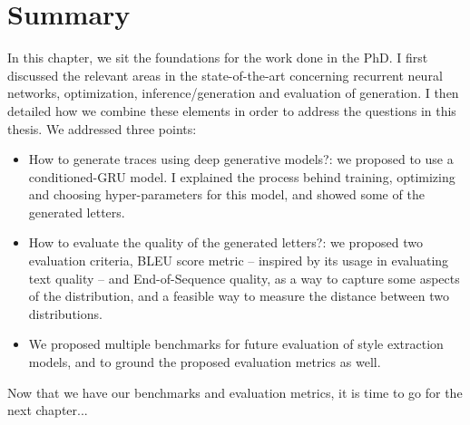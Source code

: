 \section{Summary}

\par In this chapter, we sit the foundations for the work done in the PhD. I first discussed the relevant areas in the state-of-the-art concerning recurrent neural networks, optimization, inference/generation and evaluation of generation. I then detailed how we combine these elements in order to address the questions in this thesis. We addressed three points:
\begin{itemize}
    \item How to generate traces using deep generative models?: we proposed to use a conditioned-GRU model. I explained the process behind training, optimizing and choosing hyper-parameters for this model, and showed some of the generated letters.
    \item How to evaluate the quality of the generated letters?: we proposed two evaluation criteria, BLEU score metric -- inspired by its usage in evaluating text quality -- and End-of-Sequence quality, as a way to capture some aspects of the distribution, and a feasible way to measure the distance between two distributions.
    \item We proposed multiple benchmarks for future evaluation of style extraction models, and to ground the proposed evaluation metrics as well.
\end{itemize}
Now that we have our benchmarks and evaluation metrics, it is time to go for the next chapter...
